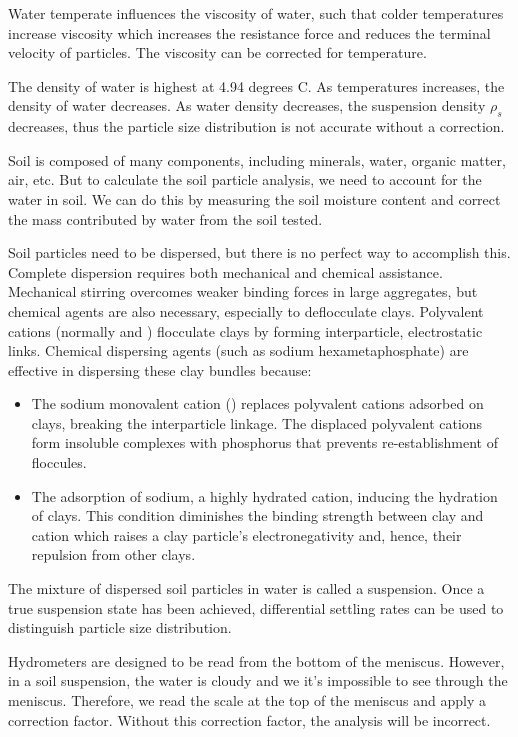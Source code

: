 \documentclass[12pt]{../SOP3_alpha}
\begin{document}
\begin{description}
	\item[Temperature and Viscosity] Water temperate influences the viscosity of water, such that colder temperatures increase viscosity which increases the resistance force and reduces the terminal velocity of particles. The viscosity can be corrected for temperature.
	\item[Temperature and Density] The density of water is highest at 4.94 degrees C. As temperatures increases, the density of water decreases. As water density decreases, the suspension density $\rho_s$ decreases, thus the particle size distribution is not accurate without a correction. 
	\item[Soil Weight and Hygroscopic Water] Soil is composed of many components, including minerals, water, organic matter, air, etc. But to calculate the soil particle analysis, we need to account for the water in soil. We can do this by measuring the soil moisture content and correct the mass contributed by water from the soil tested.
	\item[Aggregated Soil Particles] Soil particles need to be dispersed, but there is no perfect way to accomplish this. Complete dispersion requires both mechanical and chemical assistance. Mechanical stirring overcomes weaker binding forces in large aggregates, but chemical agents are also necessary, especially to deflocculate clays. Polyvalent cations (normally  and ) flocculate clays by forming interparticle, electrostatic links. Chemical dispersing agents (such as sodium hexametaphosphate) are effective in dispersing these clay bundles because:
	
	\begin{itemize}
		\item The sodium monovalent cation () replaces polyvalent cations adsorbed on clays, breaking the interparticle linkage. The displaced polyvalent cations form insoluble complexes with phosphorus that prevents re-establishment of floccules.
		\item The adsorption of sodium, a highly hydrated cation, inducing the hydration of clays. This condition diminishes the binding strength between clay and cation which raises a clay particle's electronegativity and, hence, their repulsion from other clays.
	\end{itemize}
	
\noindent The mixture of dispersed soil particles in water is called a suspension. Once a true suspension state has been achieved, differential settling rates can be used to distinguish particle size distribution.
	
	\item Hydrometers are designed to be read from the bottom of the meniscus. However, in a soil suspension, the water is cloudy and we it's impossible to see through the meniscus. Therefore, we read the scale at the top of the meniscus and apply a correction factor. Without this correction factor, the analysis will be incorrect. 
\end{description}
\end{document}

